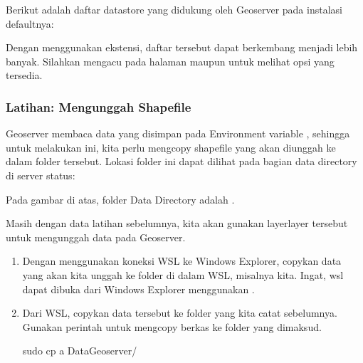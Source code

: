 \documentclass[letterpaper,10pt,english]{sphinxmanual}
\begin{document}
Berikut adalah daftar datastore yang didukung oleh Geoserver pada instalasi defaultnya:


Dengan menggunakan ekstensi, daftar tersebut dapat berkembang menjadi lebih banyak. Silahkan mengacu pada halaman  maupun  untuk melihat opsi yang tersedia.


\subsubsection{Latihan: Mengunggah Shapefile}
\label{\detokenize{sesi3/publikasi:latihan-mengunggah-shapefile}}
Geoserver membaca data yang disimpan pada Environment variable , sehingga untuk melakukan ini, kita perlu mengcopy shapefile yang akan diunggah ke dalam folder tersebut. Lokasi folder ini dapat dilihat pada bagian data directory di server status:


Pada gambar di atas, folder Data Directory adalah .

Masih dengan data latihan sebelumnya, kita akan gunakan layer\sphinxhyphen{}layer tersebut untuk mengunggah data pada Geoserver.
\begin{enumerate}
%
\item {} 
Dengan menggunakan koneksi WSL ke Windows Explorer, copykan data yang akan kita unggah ke folder di dalam WSL, misalnya  kita. Ingat, wsl dapat dibuka dari Windows Explorer menggunakan .


\item {} 
Dari WSL, copykan data tersebut ke folder  yang kita catat sebelumnya. Gunakan perintah  untuk mengcopy berkas ke folder yang dimaksud.

\begin{sphinxVerbatim}[commandchars=\\\{\}]
sudo cp \PYGZhy{}a Data\PYGZus{}Geoserver/  
\end{sphinxVerbatim}

\end{enumerate}
\end{document}
